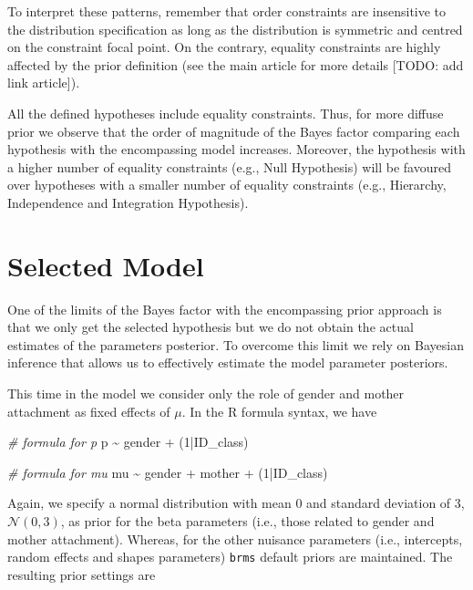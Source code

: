 \documentclass[
]{book}
\newenvironment{Shaded}{\begin{snugshade}}{\end{snugshade}}
\newcommand{\CommentTok}[1]{\textcolor[rgb]{0.56,0.35,0.01}{\textit{#1}}}
\newcommand{\DecValTok}[1]{\textcolor[rgb]{0.00,0.00,0.81}{#1}}
\newcommand{\NormalTok}[1]{#1}
\newcommand{\SpecialCharTok}[1]{\textcolor[rgb]{0.00,0.00,0.00}{#1}}
\begin{document}
To interpret these patterns, remember that order constraints are insensitive to the distribution specification as long as the distribution is symmetric and centred on the constraint focal point. On the contrary, equality constraints are highly affected by the prior definition (see the main article for more details {[}TODO: add link article{]}).

All the defined hypotheses include equality constraints. Thus, for more diffuse prior we observe that the order of magnitude of the Bayes factor comparing each hypothesis with the encompassing model increases. Moreover, the hypothesis with a higher number of equality constraints (e.g., Null Hypothesis) will be favoured over hypotheses with a smaller number of equality constraints (e.g., Hierarchy, Independence and Integration Hypothesis).

\hypertarget{selected-model-1}{%
\section{Selected Model}\label{selected-model-1}}

One of the limits of the Bayes factor with the encompassing prior approach is that we only get the selected hypothesis but we do not obtain the actual estimates of the parameters posterior. To overcome this limit we rely on Bayesian inference that allows us to effectively estimate the model parameter posteriors.

This time in the model we consider only the role of gender and mother attachment as fixed effects of \(\mu\). In the R formula syntax, we have

\begin{Shaded}
\begin{Highlighting}[]
\CommentTok{\# formula for p}
\NormalTok{p }\SpecialCharTok{\textasciitilde{}}\NormalTok{ gender }\SpecialCharTok{+}\NormalTok{ (}\DecValTok{1}\SpecialCharTok{|}\NormalTok{ID\_class)}

\CommentTok{\# formula for mu}
\NormalTok{mu }\SpecialCharTok{\textasciitilde{}}\NormalTok{ gender }\SpecialCharTok{+}\NormalTok{ mother }\SpecialCharTok{+}\NormalTok{ (}\DecValTok{1}\SpecialCharTok{|}\NormalTok{ID\_class)}
\end{Highlighting}
\end{Shaded}

Again, we specify a normal distribution with mean 0 and standard deviation of 3, \(\mathcal{N}(0,3)\), as prior for the beta parameters (i.e., those related to gender and mother attachment). Whereas, for the other nuisance parameters (i.e., intercepts, random effects and shapes parameters) \texttt{brms} default priors are maintained. The resulting prior settings are
\end{document}

